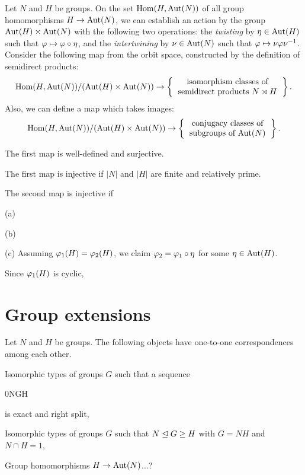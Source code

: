 \documentclass{../../large}
\begin{document}
\begin{prb}
Let $N$ and $H$ be groups.
On the set $\operatorname{Hom}(H,\operatorname{Aut}(N))$ of all group homomorphisms $H\to\operatorname{Aut}(N)$, we can establish an action by the group $\operatorname{Aut}(H)\times\operatorname{Aut}(N)$ with the following two operations:
the \emph{twisting} by $\eta\in\operatorname{Aut}(H)$ such that $\varphi\mapsto\varphi\circ\eta$, and the \emph{intertwining} by $\nu\in\operatorname{Aut}(N)$ such that $\varphi\mapsto\nu\varphi\nu^{-1}$.
Consider the following map from the orbit space, constructed by the definition of semidirect products:
\[\Hom(H,\Aut(N))/(\Aut(H)\times\Aut(N))\to\left\{\begin{tabular}{c}isomorphism classes of\\semidirect products $N\rtimes H$\end{tabular}\right\}.\]
Also, we can define a map which takes images:
\[\Hom(H,\Aut(N))/(\Aut(H)\times\Aut(N))\to\left\{\begin{tabular}{c}conjugacy classes of\\subgroups of $\Aut(N)$\end{tabular}\right\}.\]
\begin{parts}
\item The first map is well-defined and surjective.
\item The first map is injective if $|N|$ and $|H|$ are finite and relatively prime.
\item The second map is injective if
\end{parts}
\end{prb}
\begin{pf}
(a)

(b)

(c)
Assuming $\varphi_1(H)=\varphi_2(H)$, we claim $\varphi_2=\varphi_1\circ\eta$ for some $\eta\in\operatorname{Aut}(H)$.

Since $\varphi_1(H)$ is cyclic, 
\end{pf}



\section{Group extensions}

\begin{prb}
Let $N$ and $H$ be groups.
The following objects have one-to-one correspondences among each other.
\begin{parts}
\item Isomorphic types of groups $G$ such that a sequence \begin{es}0\>N\>G\>H\end{es} is exact and right split,
\item Isomorphic types of groups $G$ such that $N\trianglelefteq G\ge H$ with $G=NH$ and $N\cap H=1$,
\item Group homomorphisms $H\to\operatorname{Aut}(N)$...?
\end{parts}
\end{prb}
\end{document}
